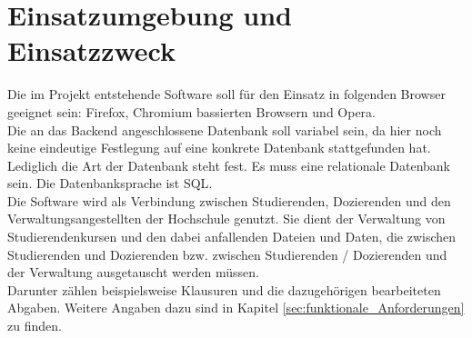 
\chapter{Einsatzumgebung und Einsatzzweck}
Die im Projekt entstehende Software soll für den Einsatz in folgenden Browser geeignet sein: Firefox, Chromium bassierten Browsern und Opera. \\
Die an das \gls{Backend} angeschlossene Datenbank soll variabel sein, da hier noch keine eindeutige Festlegung auf eine konkrete Datenbank stattgefunden hat. Lediglich die Art der Datenbank steht fest. Es muss eine \gls{relationale Datenbank} sein. Die Datenbanksprache ist \gls{SQL}.\\

Die Software wird als Verbindung zwischen \gls{Studierende}n, \gls{Dozierende}n und den \gls{Verwaltungsangestellte}n der Hochschule genutzt. Sie dient der Verwaltung von Studierendenkursen und den dabei anfallenden Dateien und Daten, die zwischen \gls{Studierende}n und \gls{Dozierende}n bzw. zwischen \gls{Studierende}n / \gls{Dozierende}n und der Verwaltung ausgetauscht werden müssen. \\
Darunter zählen beispielsweise Klausuren und die dazugehörigen bearbeiteten Abgaben. Weitere Angaben dazu sind in Kapitel \ref{sec:funktionale_Anforderungen} zu finden. 
